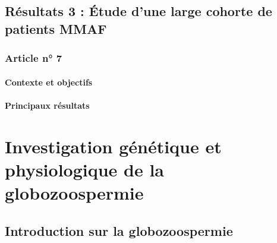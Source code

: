 \documentclass[12pt,twoside]{ugathesis}
\begin{document}
\section{Résultats 3 : Étude d'une large cohorte de patients
MMAF}\label{resultats-3-etude-dune-large-cohorte-de-patients-mmaf}

\subsection{Article n° 7}\label{article-n-7}

\subsubsection{Contexte et objectifs}\label{contexte-et-objectifs-4}

\subsubsection{Principaux résultats}\label{principaux-resultats-4}

\chapter{Investigation génétique et physiologique de la
globozoospermie}\label{globo}

\section{Introduction sur la
globozoospermie}\label{introduction-sur-la-globozoospermie}
\end{document}
